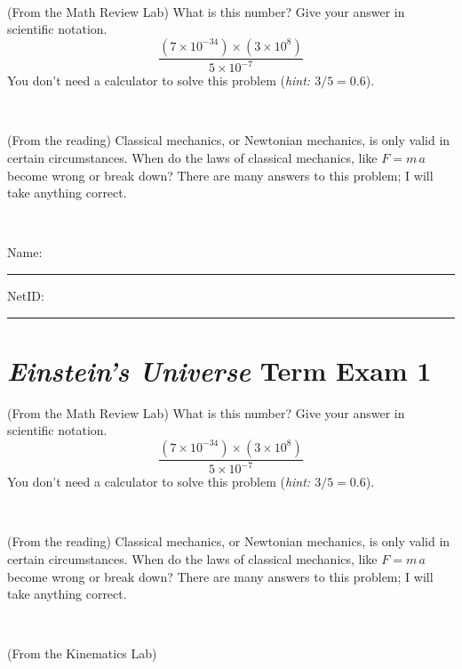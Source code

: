 \documentclass[12pt, letterpaper]{article}
\begin{document}
\vfill ~

\begin{problem} (From the Math Review Lab)
What is this number? Give your answer in scientific notation.
$$
\frac{(7\times10^{-34})\times(3\times10^8)}{5\times10^{-7}}
$$
You don't need a calculator to solve this problem (\textit{hint: $3/5=0.6$}).
\end{problem}


\vfill ~

\begin{problem} (From the reading)
Classical mechanics, or Newtonian mechanics, is only valid in certain
circumstances. When do the laws of classical mechanics, like $F =
m\,a$ become wrong or break down? There are many answers to this
problem; I will take anything correct.
\end{problem}


\vfill ~


\cleardoublepage



\noindent
Name: \rule[-1ex]{0.60\textwidth}{0.1pt}
NetID: \rule[-1ex]{0.20\textwidth}{0.1pt}

\section*{\textsl{Einstein's Universe} Term Exam 1}
\setcounter{problem}{1}


\begin{problem} (From the Math Review Lab)
What is this number? Give your answer in scientific notation.
$$
\frac{(7\times10^{-34})\times(3\times10^8)}{5\times10^{-7}}
$$
You don't need a calculator to solve this problem (\textit{hint: $3/5=0.6$}).
\end{problem}


\vfill ~

\begin{problem} (From the reading)
Classical mechanics, or Newtonian mechanics, is only valid in certain
circumstances. When do the laws of classical mechanics, like $F =
m\,a$ become wrong or break down? There are many answers to this
problem; I will take anything correct.
\end{problem}


\vfill ~

\begin{problem} (From the Kinematics Lab)

\end{problem}


\vfill ~
\end{document}
